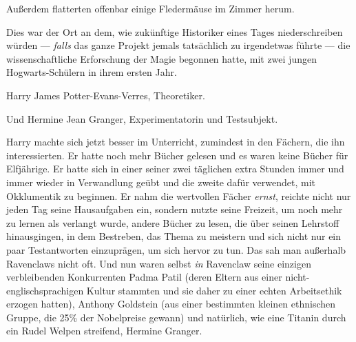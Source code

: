 Außerdem flatterten offenbar einige Fledermäuse im Zimmer herum.

Dies war der Ort an dem, wie zukünftige Historiker eines Tages niederschreiben würden — \emph{falls} das ganze Projekt jemals tatsächlich zu irgendetwas führte — die wissenschaftliche Erforschung der Magie begonnen hatte, mit zwei jungen Hogwarts-Schülern in ihrem ersten Jahr.

Harry James Potter-Evans-Verres, Theoretiker.

Und Hermine Jean Granger, Experimentatorin und Testsubjekt.

Harry machte sich jetzt besser im Unterricht, zumindest in den Fächern, die ihn interessierten. Er hatte noch mehr Bücher gelesen und es waren keine Bücher für Elfjährige. Er hatte sich in einer seiner zwei täglichen extra Stunden immer und immer wieder in Verwandlung geübt und die zweite dafür verwendet, mit Okklumentik zu beginnen. Er nahm die wertvollen Fächer \emph{ernst}, reichte nicht nur jeden Tag seine Hausaufgaben ein, sondern nutzte seine Freizeit, um noch mehr zu lernen als verlangt wurde, andere Bücher zu lesen, die über seinen Lehrstoff hinausgingen, in dem Bestreben, das Thema zu meistern und sich nicht nur ein paar Testantworten einzuprägen, um sich hervor zu tun. Das sah man außerhalb Ravenclaws nicht oft. Und nun waren selbst \emph{in} Ravenclaw seine einzigen verbleibenden Konkurrenten Padma Patil (deren Eltern aus einer nicht-englischsprachigen Kultur stammten und sie daher zu einer echten Arbeitsethik erzogen hatten), Anthony Goldstein (aus einer bestimmten kleinen ethnischen Gruppe, die 25\% der Nobelpreise gewann) und natürlich, wie eine Titanin durch ein Rudel Welpen streifend, Hermine Granger.

